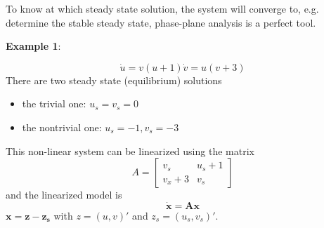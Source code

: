 To know at which steady state solution, the system will converge to,
e.g. determine the stable steady state, phase-plane analysis is a
perfect tool. 

{\bf Example 1}:

\begin{equation}
  \label{eq:109}
  \dot{u} = v(u+1)
  \dot{v} = u(v+3)
\end{equation}
There are two steady state (equilibrium) solutions
\begin{itemize}
\item the trivial one: $u_s=v_s=0$
\item the nontrivial one: $u_s=-1, v_s=-3$
\end{itemize}
This non-linear system can be linearized using the matrix
\begin{equation}
  \label{eq:110}
  A = \left[
    \begin{array}{cc}
      v_s & u_s + 1 \\
      v_x+3 & v_s 
    \end{array} 
    \right]
\end{equation}
and the linearized model is 
\begin{equation}
  \label{eq:112}
  \mathbf{\dot{x} = Ax}
\end{equation}
 $\mathbf{x=z-z_s}$ with $z=(u,v)'$ and $z_s = (u_s,v_s)'$.

